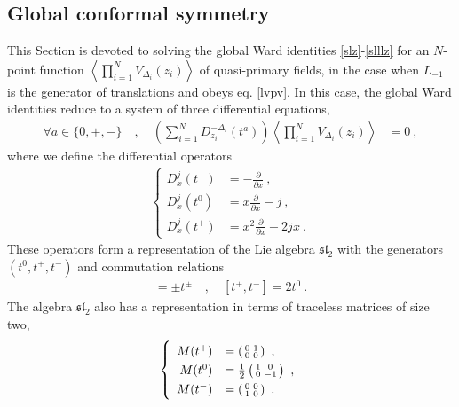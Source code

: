 \documentclass[12pt,a4paper,notitlepage]{report}
\numberwithin{equation}{section}
\theoremstyle{break}
\begin{document}
\subsection{Global conformal symmetry \label{secgcs}}

This Section is devoted to solving the global Ward identities \eqref{slz}-\eqref{slllz} for an $N$-point function $\left\langle \prod_{i=1}^N V_{\Delta_i}(z_i)\right\rangle$ of quasi-primary fields, in the case when $L_{-1}$ is the generator of translations and obeys eq. \eqref{lvpv}. 
In this case, the global Ward identities reduce to a system of three differential equations, 
\begin{align}
\forall a \in \{0,+,-\}\quad , \quad 
 \left(\sum_{i=1}^N D_{z_i}^{-\Delta_i}(t^a)\right) \left\langle \prod_{i=1}^N V_{\Delta_i}(z_i)\right\rangle & = 0\ ,
\label{spz}
\end{align}
where we define the differential operators
\begin{align}
 \left\{ \begin{array}{rl} D_x^{j}(t^-) & = -{\frac{\partial}{\partial x}}\ ,
\\
D_x^{j}(t^0) &  = x{\frac{\partial}{\partial x}} -j\ ,
\\
D_x^{j}(t^+) & = x^2{\frac{\partial}{\partial x}} - 2j x \ .
\end{array}\right. 
\label{ddz}
\end{align}
These operators form a representation of the Lie algebra \textbf{\boldmath $\mathfrak{sl}_2$}  with the generators $(t^0,t^+,t^-)$ and commutation relations 
\begin{align}
 [t^0,t^\pm ] =\pm t^\pm \quad , \quad [t^+,t^-]=2t^0\ .
\label{ttpm}
\end{align}
The algebra $\mathfrak{sl}_2$ also has a representation in terms of traceless matrices of size two,
\begin{align}
\renewcommand{\arraystretch}{1.3}
\left\{ \begin{array}{rl}
 M(t^+)& = \left(\begin{smallmatrix} 0 & 1 \\ 0& 0 \end{smallmatrix} \right) \ , 
\\
 M(t^0) &= \frac12\left(\begin{smallmatrix} 1 & 0 \\ 0 & -1 \end{smallmatrix}\right)\ ,
\\
M(t^-) & = \left(\begin{smallmatrix} 0 & 0 \\ 1 & 0 \end{smallmatrix} \right) \ .
\end{array} \right.
\label{mta}
\end{align}
\end{document}
